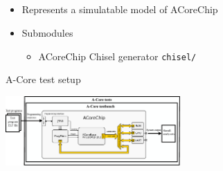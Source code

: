 \documentclass{sdkslides}
\begin{document}
\subsection*{\sectionname}
\begin{frame}[c,fragile]
    \frametitle{\sectionname}
    \begin{itemize}
        \item Represents a simulatable model of ACoreChip
        \item Submodules
        \begin{itemize}
            \item ACoreChip Chisel generator \verb|chisel/|
        \end{itemize}
    \end{itemize}
    \begin{block}{A-Core test setup}
        \begin{center}
            \includegraphics[width=0.5\textwidth]{./Pics/A-Core_testsetup.eps}
        \end{center}
    \end{block}
\end{frame}

\renewcommand{\sectionname}{ACoreTestbenches}
\end{document}
